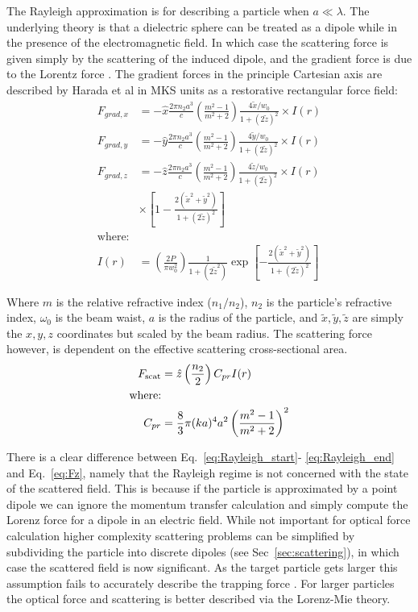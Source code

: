 The Rayleigh approximation is for describing a particle when 
$a \ll \lambda$. The underlying theory is that a dielectric sphere 
can be treated as a dipole while in the presence of the 
electromagnetic field. In which case the scattering force is 
given simply by the scattering of the induced dipole, and the 
gradient force is due to the Lorentz force \cite{Gordon1973}. 
The gradient forces in the principle Cartesian axis are 
described by Harada et al \cite{YasuhiroHarada1996} in MKS units 
as a restorative rectangular force field:
\begin{align}
  F_{grad,x}
  &=-\hat{x} \frac{2\pi n_2 a^3}{c}
    \left(\frac{m^2-1}{m^2+2}\right) \frac{4\tilde{x}/w_0}{1+(2\tilde{z})^2} \times I(r)
  \label{eq:Rayleigh_start}\\
  F_{grad,y}
  &=-\hat{y} \frac{2\pi n_2 a^3}{c}
    \left(\frac{m^2-1}{m^2+2}\right) \frac{4\tilde{y}/w_0}{1+(2\tilde{z})^2} \times I(r)
  \\
  F_{grad,z}
  &=-\hat{z} \frac{2\pi n_2 a^3}{c}
    \left(\frac{m^2-1}{m^2+2}\right) \frac{4\tilde{z}/w_0}{1+(2\tilde{z})^2}
    \nonumber \times I(r)
  \\ 
  & \times \left[1-\frac{2(\tilde{x}^2+\tilde{y}^2)}{1+(2\tilde{z})^2} \right]
  \\
  \label{eq:Rayleigh_end}
  \text{where:}
  \nonumber
  \\
	I(r) &= \left(\frac{2P}{\pi w_0^2}\right) \frac{1}{1+(2\tilde{z}^2)} 
	\exp \left[ - \frac{2(\tilde{x}^2+\tilde{y}^2)}{1+(2\tilde{z})^2} \right]
\end{align}

\noindent
Where $m$ is the relative refractive index ($n_1/n_2$), $n_2$ is 
the particle's refractive index, $\omega_0$ is the beam waist, 
$a$ is the radius of the particle, and $\tilde{x}, \tilde{y}, 
\tilde{z}$ are simply the $x, y, z$ coordinates but scaled by the 
beam radius. The scattering force however, is dependent on the 
effective scattering cross-sectional area. 
\begin{align}
  F_{\rm scat}
  &= \hat{z} \left(\frac{n_2}{2}\right) C_{pr} I(r) \\
  \text{where:} \nonumber \\
  C_{pr} &= \frac{8}{3} \pi (ka)^4 a^2 \left(\frac{m^2-1}{m^2+2}\right)^2
\end{align}

There is a clear difference between Eq.~\eqref{eq:Rayleigh_start}-
\eqref{eq:Rayleigh_end} and Eq.~\eqref{eq:Fz}, namely that the 
Rayleigh regime is not concerned with the state of the scattered
field. This is because if the particle is approximated by a point
dipole we can ignore the momentum transfer calculation and simply
compute the Lorenz force for a dipole in an electric field. While 
not important for optical force calculation higher complexity 
scattering problems can be simplified by subdividing the particle 
into discrete dipoles (see Sec~\ref{sec:scattering}), in which case 
the scattered field is now significant. As the target particle gets 
larger this assumption fails to accurately describe the trapping force \cite{Li2021}. For larger particles the optical force and scattering 
is better described via the Lorenz-Mie theory. 

